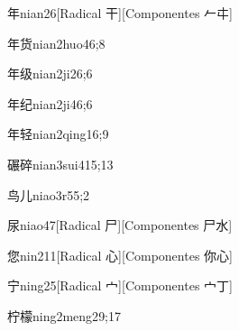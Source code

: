 \begin{verbete}{年}{nian2}{6}[Radical 干][Componentes 𠂉㐄]
\end{verbete}

\begin{verbete}{年货}{nian2huo4}{6;8}
\end{verbete}

\begin{verbete}{年级}{nian2ji2}{6;6}
\end{verbete}

\begin{verbete}{年纪}{nian2ji4}{6;6}
\end{verbete}

\begin{verbete}{年轻}{nian2qing1}{6;9}
\end{verbete}

\begin{verbete}{碾碎}{nian3sui4}{15;13}
\end{verbete}

\begin{verbete}{鸟儿}{niao3r5}{5;2}
\end{verbete}

\begin{verbete}{尿}{niao4}{7}[Radical 尸][Componentes 尸水]
\end{verbete}

\begin{verbete}{您}{nin2}{11}[Radical 心][Componentes 你心]
\end{verbete}

\begin{verbete}{宁}{ning2}{5}[Radical 宀][Componentes 宀丁]
\end{verbete}

\begin{verbete}{柠檬}{ning2meng2}{9;17}
\end{verbete}


